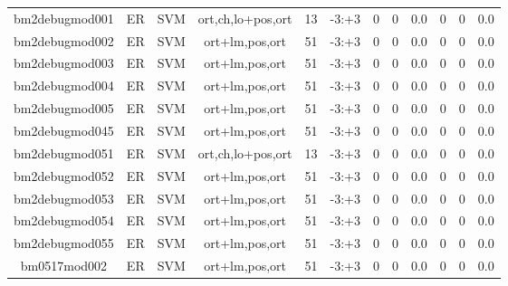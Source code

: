 \documentclass[a4paper]{article}
\begin{document}
\begin{landscape}
\begin{center}
\begin{tabular}{ |c|c|c|c|c|c|c|c|c|c|c|c|}
 	\small{ bm2debugmod001 } & ER & SVM & ort,ch,lo+pos,ort  &  13 &  -3:+3  &  0 & 0 & 0.0  &  0 & 0 & 0.0 \\
 	

 
 	
 	\small{ bm2debugmod002 } & ER & SVM & ort+lm,pos,ort  &  51 &  -3:+3  &  0 & 0 & 0.0  &  0 & 0 & 0.0 \\
 	

 
 	
 	\small{ bm2debugmod003 } & ER & SVM & ort+lm,pos,ort  &  51 &  -3:+3  &  0 & 0 & 0.0  &  0 & 0 & 0.0 \\
 	

 
 	
 	\small{ bm2debugmod004 } & ER & SVM & ort+lm,pos,ort  &  51 &  -3:+3  &  0 & 0 & 0.0  &  0 & 0 & 0.0 \\
 	

 
 	
 	\small{ bm2debugmod005 } & ER & SVM & ort+lm,pos,ort  &  51 &  -3:+3  &  0 & 0 & 0.0  &  0 & 0 & 0.0 \\
 	

 
 	
 	\small{ bm2debugmod045 } & ER & SVM & ort+lm,pos,ort  &  51 &  -3:+3  &  0 & 0 & 0.0  &  0 & 0 & 0.0 \\
 	

 
 	
 	\small{ bm2debugmod051 } & ER & SVM & ort,ch,lo+pos,ort  &  13 &  -3:+3  &  0 & 0 & 0.0  &  0 & 0 & 0.0 \\
 	

 
 	
 	\small{ bm2debugmod052 } & ER & SVM & ort+lm,pos,ort  &  51 &  -3:+3  &  0 & 0 & 0.0  &  0 & 0 & 0.0 \\
 	

 
 	
 	\small{ bm2debugmod053 } & ER & SVM & ort+lm,pos,ort  &  51 &  -3:+3  &  0 & 0 & 0.0  &  0 & 0 & 0.0 \\
 	

 
 	
 	\small{ bm2debugmod054 } & ER & SVM & ort+lm,pos,ort  &  51 &  -3:+3  &  0 & 0 & 0.0  &  0 & 0 & 0.0 \\
 	

 
 	
 	\small{ bm2debugmod055 } & ER & SVM & ort+lm,pos,ort  &  51 &  -3:+3  &  0 & 0 & 0.0  &  0 & 0 & 0.0 \\
 	

 
 	
 	\small{ bm0517mod002 } & ER & SVM & ort+lm,pos,ort  &  51 &  -3:+3  &  0 & 0 & 0.0  &  0 & 0 & 0.0 \\
 	


\end{tabular}
\end{center}
\end{landscape}
\end{document}
